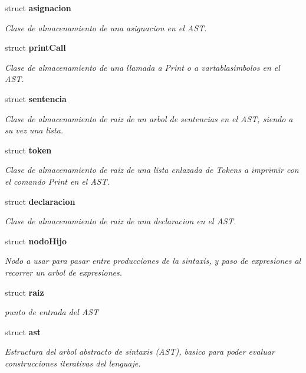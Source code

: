 \begin{CompactItemize}
struct {\bf asignacion}
\begin{CompactList}\small\item\em Clase de almacenamiento de una asignacion en el AST. \item\end{CompactList}\item 
struct {\bf print\-Call}
\begin{CompactList}\small\item\em Clase de almacenamiento de una llamada a Print o a vartablasimbolos en el AST. \item\end{CompactList}\item 
struct {\bf sentencia}
\begin{CompactList}\small\item\em Clase de almacenamiento de raiz de un arbol de sentencias en el AST, siendo a su vez una lista. \item\end{CompactList}\item 
struct {\bf token}
\begin{CompactList}\small\item\em Clase de almacenamiento de raiz de una lista enlazada de Tokens a imprimir con el comando Print en el AST. \item\end{CompactList}\item 
struct {\bf declaracion}
\begin{CompactList}\small\item\em Clase de almacenamiento de raiz de una declaracion en el AST. \item\end{CompactList}\item 
struct {\bf nodo\-Hijo}
\begin{CompactList}\small\item\em Nodo a usar para pasar entre producciones de la sintaxis, y paso de expresiones al recorrer un arbol de expresiones. \item\end{CompactList}\item 
struct {\bf raiz}
\begin{CompactList}\small\item\em punto de entrada del AST \item\end{CompactList}\item 
struct {\bf ast}
\begin{CompactList}\small\item\em Estructura del arbol abstracto de sintaxis (AST), basico para poder evaluar construcciones iterativas del lenguaje. \item\end{CompactList}\end{CompactItemize}
